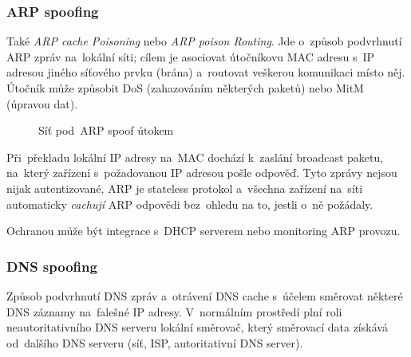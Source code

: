\subsubsection{ARP spoofing}

Také \emph{ARP cache Poisoning} nebo \emph{ARP poison Routing}. Jde o~způsob podvrhnutí ARP zpráv na~lokální síti; cílem je asociovat útočníkovu MAC adresu s~IP adresou jiného síťového prvku (brána) a~routovat veškerou komunikaci místo něj. Útočník může způsobit DoS (zahazováním některých paketů) nebo MitM (úpravou dat).

\begin{figure}[ht]
\centering
{}
\caption*{Síť pod~ARP spoof útokem}
\end{figure}

Při~překladu lokální IP adresy na~MAC dochází k~zaslání broadcast paketu, na~který zařízení s~požadovanou IP adresou pošle odpověď. Tyto zprávy nejsou nijak autentizované, ARP je stateless protokol a~všechna zařízení na~síti automaticky \emph{cachují} ARP odpovědi bez~ohledu na to, jestli o~ně požádaly.

Ochranou může být integrace s~DHCP serverem nebo monitoring ARP provozu.

\subsubsection{DNS spoofing}

Způsob podvrhnutí DNS zpráv a~otrávení DNS cache s~účelem směrovat některé DNS záznamy na~falešné IP adresy. V~normálním prostředí plní roli neautoritativního DNS serveru lokální směrovač, který směrovací data získává od~dalšího DNS serveru (síť, ISP, autoritativní DNS server).

